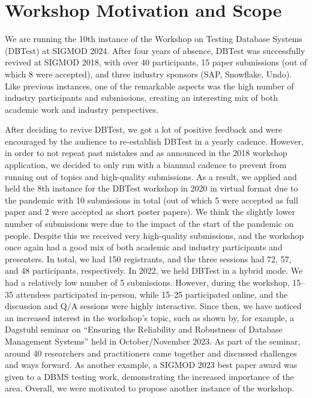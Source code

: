 \documentclass[sigconf]{acmart}
\begin{document}
\maketitle

\section{Workshop Motivation and Scope}
We are running the 10th instance of the Workshop on Testing Database Systems (DBTest) at SIGMOD
2024. After four years of absence, DBTest was successfully revived at SIGMOD 2018, with over 40
participants, 15 paper submissions (out of which 8 were accepted), and three industry sponsors (SAP,
Snowflake, Undo). Like previous instances, one of the remarkable aspects was the high number of industry
participants and submissions, creating an interesting mix of both academic work and industry
perspectives.

After deciding to revive DBTest, we got a lot of positive feedback and were encouraged by the audience
to re-establish DBTest in a yearly cadence. However, in order to not repeat past mistakes and as
announced in the 2018 workshop application, we decided to only run with a biannual cadence to prevent
from running out of topics and high-quality submissions. As a result, we applied and held the 8th instance
for the DBTest workshop in 2020 in virtual format due to the pandemic with 10 submissions in total (out
of which 5 were accepted as full paper and 2 were accepted as short poster papers). We think the slightly
lower number of submissions were due to the impact of the start of the pandemic on people. Despite this
we received very high-quality submissions, and the workshop once again had a good mix of both academic
and industry participants and presenters. In total, we had 150 registrants, and the three sessions had 72,
57, and 48 participants, respectively. In 2022, we held DBTest in a hybrid mode. We had a relatively low
number of 5 submissions. However, during the workshop, 15--35 attendees participated in-person, while
15--25 participated online, and the discussion and Q/A sessions were highly interactive. Since then, we
have noticed an increased interest in the workshop’s topic, such as shown by, for example, a Dagstuhl
seminar on “Ensuring the Reliability and Robustness of Database Management Systems” held in
October/November 2023. As part of the seminar, around 40 researchers and practitioners came together
and discussed challenges and ways forward. As another example, a SIGMOD 2023 best paper award was
given to a DBMS testing work, demonstrating the increased importance of the area. Overall, we were motivated to propose another instance of the workshop.
\end{document}
